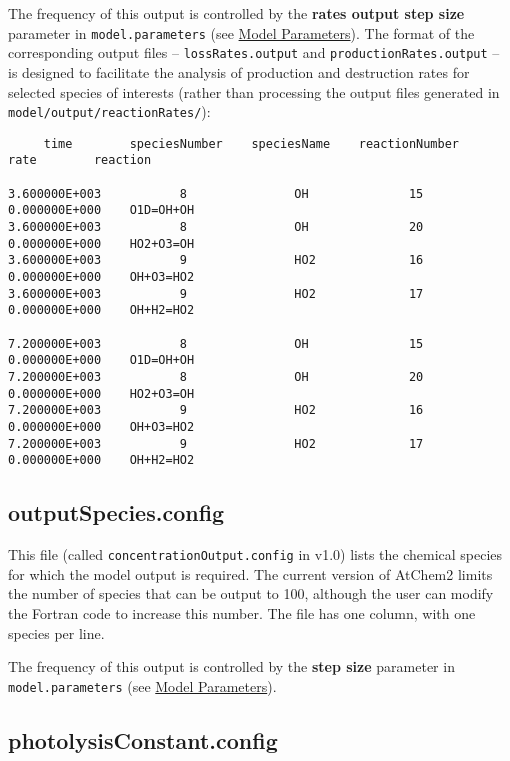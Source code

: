 The frequency of this output is controlled by the \textbf{rates output
  step size} parameter in \texttt{model.parameters} (see
\hyperref[sec:model-parameters]{Model Parameters}). The format of the
corresponding output files -- \texttt{lossRates.output} and
\texttt{productionRates.output} -- is designed to facilitate the
analysis of production and destruction rates for selected species of
interests (rather than processing the output files generated in
\texttt{model/output/reactionRates/}):

\newpage
\begin{scriptsize}
\begin{verbatim}
     time        speciesNumber    speciesName    reactionNumber         rate        reaction

3.600000E+003           8               OH              15         0.000000E+000    O1D=OH+OH
3.600000E+003           8               OH              20         0.000000E+000    HO2+O3=OH
3.600000E+003           9               HO2             16         0.000000E+000    OH+O3=HO2
3.600000E+003           9               HO2             17         0.000000E+000    OH+H2=HO2

7.200000E+003           8               OH              15         0.000000E+000    O1D=OH+OH
7.200000E+003           8               OH              20         0.000000E+000    HO2+O3=OH
7.200000E+003           9               HO2             16         0.000000E+000    OH+O3=HO2
7.200000E+003           9               HO2             17         0.000000E+000    OH+H2=HO2
\end{verbatim}
\end{scriptsize}

\subsection{outputSpecies.config} \label{subsec:outputspecies}

This file (called \texttt{concentrationOutput.config} in v1.0) lists
the chemical species for which the model output is required. The
current version of AtChem2 limits the number of species that can be
output to 100, although the user can modify the Fortran code to
increase this number. The file has one column, with one species per
line.

The frequency of this output is controlled by the \textbf{step size}
parameter in \texttt{model.parameters} (see
\hyperref[sec:model-parameters]{Model Parameters}).

\subsection{photolysisConstant.config} \label{subsec:photolysisconstant}


